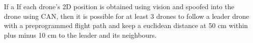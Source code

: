 If a 
If each drone’s 2D position is obtained using vision and spoofed into the drone using CAN, then it is possible for at least 3 drones to follow a leader drone with a preprogrammed flight path and keep a euclidean distance at 50 cm within plus minus 10 cm to the leader and its neighbours.

